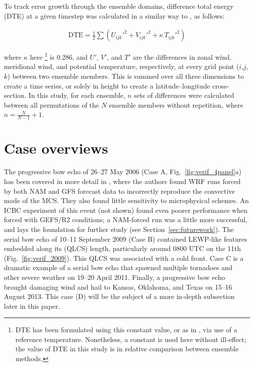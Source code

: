 \documentclass{ametsoc}
\def\gefs{\mbox{GEFS/R2}} %
\begin{document}
To track error growth through the ensemble domains, difference total energy (DTE) at a given timestep was calculated in a similar way to \citet{Tan2004-ss}, as follows:

\begin{align}
\textrm{DTE} = \frac{1}{2} \sum (U_{ijk}'^2 + V_{ijk}'^2 + \kappa \, T_{ijk}'^2) 
\end{align}

\noindent where $\kappa$ here \footnote{DTE has been formulated using this constant value, or as in \citet{Tan2004-ss}, via use of a reference temperature. Nonetheless, a constant is used here without ill-effect; the value of DTE in this study is in relative comparison between ensemble methods.} is 0.286, and $U'$, $V'$, and $T'$ are the differences in zonal wind, meridional wind, and potential temperature, respectively, at every grid point ($i$,$j$,$k$) between two ensemble members. This is summed over all three dimensions to create a time series, or solely in height to create a latitude--longitude cross-section. In this study, for each ensemble, $n$ sets of differences were calculated between all permutations of the $N$ ensemble members without repetition, where $n = \frac{N}{N-1} + 1$. 

\section{Case overviews}

The progressive bow echo of 26--27 May 2006 (Case A, Fig.~\ref{fig:verif_4panel}a) has been covered in more detail in \citet{Snively2014-pr}, where the authors found WRF runs forced by both NAM and GFS forecast data to incorrectly reproduce the convective mode of the MCS. They also found little sensitivity to microphysical schemes. An ICBC experiment of this event (not shown) found even poorer performance when forced with \gefs{} conditions; a NAM-forced run was a little more successful, and lays the foundation for further study (see Section~\ref{sec:futurework}). The serial bow echo of 10--11 September 2009 (Case B) contained LEWP-like features embedded along its (QLCS) length, particularly around 0800 UTC on the 11th (Fig.~\ref{fig:verif_2009}). This QLCS was associated with a cold front. Case C is a dramatic example of a serial bow echo that spawned multiple tornadoes and other severe weather on 19--20 April 2011. Finally, a progressive bow echo brought damaging wind and hail to Kansas, Oklahoma, and Texas on 15--16 August 2013. This case (D) will be the subject of a more in-depth subsection later in this paper.
\end{document}
